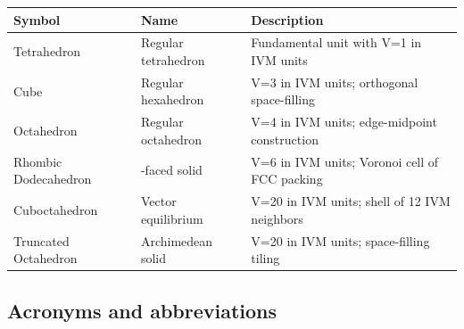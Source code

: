 \documentclass[
  10pt,
]{article}
\newcounter{none} %
\begin{document}
{\def\LTcaptype{none} %
\begin{longtable}[]{@{}
  >{\raggedright\arraybackslash}p{}
  >{\raggedright\arraybackslash}p{}
  >{\raggedright\arraybackslash}p{}@{}}
\toprule\noalign{}
\begin{minipage}[b]{\linewidth}\raggedright
Symbol
\end{minipage} & \begin{minipage}[b]{\linewidth}\raggedright
Name
\end{minipage} & \begin{minipage}[b]{\linewidth}\raggedright
Description
\end{minipage} \\
\midrule\noalign{}
\endhead
\bottomrule\noalign{}
\endlastfoot
Tetrahedron & Regular tetrahedron & Fundamental unit with V=1 in IVM
units \\
Cube & Regular hexahedron & V=3 in IVM units; orthogonal
space-filling \\
Octahedron & Regular octahedron & V=4 in IVM units; edge-midpoint
construction \\
Rhombic Dodecahedron & 12-faced solid & V=6 in IVM units; Voronoi cell
of FCC packing \\
Cuboctahedron & Vector equilibrium & V=20 in IVM units; shell of 12 IVM
neighbors \\
Truncated Octahedron & Archimedean solid & V=20 in IVM units;
space-filling tiling \\
\end{longtable}
}

\subsection{Acronyms and
abbreviations}\label{acronyms-and-abbreviations}
\end{document}
